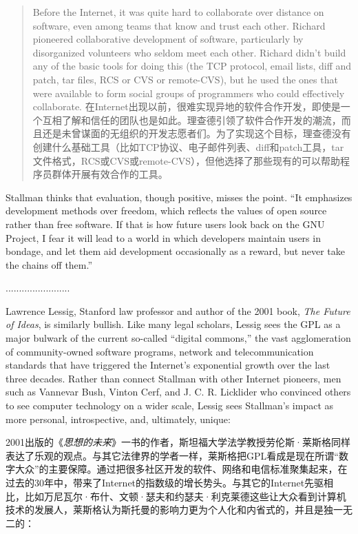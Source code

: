 \begin{quote}
\ifdefined\eng
Before the Internet, it was quite hard to collaborate over distance on software, even among teams that know and trust each other. Richard pioneered collaborative development of software, particularly by disorganized volunteers who seldom meet each other. Richard didn't build any of the basic tools for doing this (the TCP protocol, email lists, diff and patch, tar files, RCS or CVS or remote-CVS), but he used the ones that were available to form social groups of programmers who could effectively collaborate.
\fi
\ifdefined\chs
在Internet出现以前，很难实现异地的软件合作开发，即使是一个互相了解和信任的团队也是如此。理查德引领了软件合作开发的潮流，而且还是未曾谋面的无组织的开发志愿者们。为了实现这个目标，理查德没有创建什么基础工具（比如TCP协议、电子邮件列表、diff和patch工具，tar文件格式，RCS或CVS或remote-CVS），但他选择了那些现有的可以帮助程序员群体开展有效合作的工具。
\fi
\end{quote}

\ifdefined\eng
Stallman thinks that evaluation, though positive, misses the point. ``It emphasizes development methods over freedom, which reflects the values of open source rather than free software.  If that is how future users look back on the GNU Project, I fear it will lead to a world in which developers maintain users in bondage, and let them aid development occasionally as a reward, but never take the chains off them.''
\fi

\ifdefined\chs
........................
\fi

\ifdefined\eng
Lawrence Lessig, Stanford law professor and author of the 2001 book, \textit{The Future of Ideas}, is similarly bullish. Like many legal scholars, Lessig sees the GPL as a major bulwark of the current so-called ``digital commons,'' the vast agglomeration of community-owned software programs, network and telecommunication standards that have triggered the Internet's exponential growth over the last three decades. Rather than connect Stallman with other Internet pioneers, men such as Vannevar Bush, Vinton Cerf, and J. C. R. Licklider who convinced others to see computer technology on a wider scale, Lessig sees Stallman's impact as more personal, introspective, and, ultimately, unique:
\fi

\ifdefined\chs
2001出版的《\textit{思想的未来}》一书的作者，斯坦福大学法学教授劳伦斯·莱斯格同样表达了乐观的观点。与其它法律界的学者一样，莱斯格把GPL看成是现在所谓“数字大众”的主要保障。通过把很多社区开发的软件、网络和电信标准聚集起来，在过去的30年中，带来了Internet的指数级的增长势头。与其它的Internet先驱相比，比如万尼瓦尔·布什、文顿·瑟夫和约瑟夫·利克莱德这些让大众看到计算机技术的发展人，莱斯格认为斯托曼的影响力更为个人化和内省式的，并且是独一无二的：
\fi

